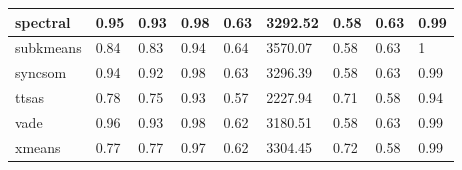 \begin{table}[H]
\begin{tabular}{|l|l|l|l|l|l|l|l|l|}
\hline
spectral & 0.95 & 0.93 & 0.98 & 0.63 & 3292.52 & 0.58 & 0.63 & 0.99 \\
\hline
subkmeans & 0.84 & 0.83 & 0.94 & 0.64 & 3570.07 & 0.58 & 0.63 & 1 \\
\hline
syncsom & 0.94 & 0.92 & 0.98 & 0.63 & 3296.39 & 0.58 & 0.63 & 0.99 \\
\hline
ttsas & 0.78 & 0.75 & 0.93 & 0.57 & 2227.94 & 0.71 & 0.58 & 0.94 \\
\hline
vade & 0.96 & 0.93 & 0.98 & 0.62 & 3180.51 & 0.58 & 0.63 & 0.99 \\
\hline
xmeans & 0.77 & 0.77 & 0.97 & 0.62 & 3304.45 & 0.72 & 0.58 & 0.99 \\
\hline
\end{tabular}
\end{table}



